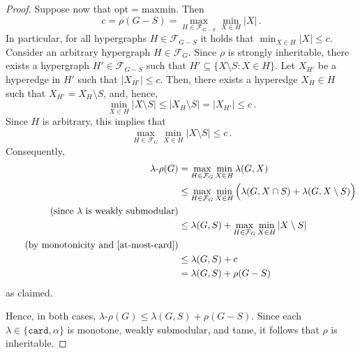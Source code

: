 \documentclass[10pt,a4paper]{amsart}
\begin{document}
\begin{proof}
Suppose now that $\mathrm{opt}= \mathrm{maxmin}$.
Then 
\[c = \rho(G-S) =\max_{H \in \mathcal{F}_{G-S}} \min_{X \in H} |X|\,.\]
In particular, for all hypergraphs $H \in \mathcal{F}_{G-S}$ it holds that $\min_{X \in H} |X| \le c$.
Consider an arbitrary hypergraph $H\in  \mathcal{F}_{G}$.
Since $\rho$ is strongly inheritable, there exists a hypergraph $H'\in \mathcal{F}_{G-S}$ such that $H'\subseteq \{X\setminus S\colon X\in H\}$.
Let $X_{H'}$ be a hyperedge in $H'$ such that $|X_{H'}|\le c$.
Then, there exists a hyperedge $X_H\in H$ such that $X_{H'} = X_H\setminus S$, and, hence,
\[\min_{X \in H} |X\setminus S|\le |X_H\setminus S| = |X_{H'}|\le c\,.\]
Since $H$ is arbitrary, this implies that 
\[\max_{H \in \mathcal{F}_{G}} \min_{X \in H} |X\setminus S| \le c\,.\]
Consequently, 
\begin{alignat*}{1}
\lambda\text{-}\rho(G) &= \max_{H \in \mathcal{F}_{G}} \min_{X \in H} \lambda(G,X)\\
&\le \max_{H \in \mathcal{F}_{G}} \min_{X \in H} \Big(\lambda(G,X \cap S) + \lambda(G,X\setminus S)\Big)\\ \tag*{\text{(since $\lambda$ is weakly submodular)}}\\
&\le \lambda(G,S) + \max_{H \in \mathcal{F}_{G}} \min_{X \in H} |X\setminus S|\\ \tag*{\text{(by monotonicity and \Cref{at-most-card})}}\\
&\le \lambda(G,S) +c\\
&= \lambda(G,S) + \rho(G-S)\,
\end{alignat*}
as claimed.

Hence, in both cases, $\lambda\text{-}\rho(G)\le \lambda(G,S) + \rho(G-S)$.
Since each $\lambda\in \{\mathtt{card},\alpha\}$ is  monotone, weakly submodular, and tame, it follows that $\rho$ is inheritable.
\end{proof}
\end{document}
